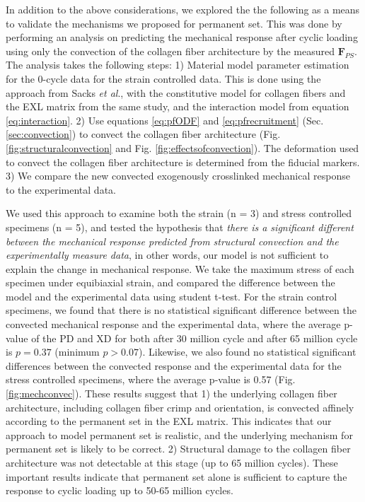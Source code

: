	In addition to the above considerations, we explored the the following as a means to validate the mechanisms we proposed for permanent set. This was done by performing an analysis on predicting the mechanical response after cyclic loading using only the convection of the collagen fiber architecture by the measured $\textbf{F}_{PS}$. The analysis takes the following steps: 1) Material model parameter estimation for the 0-cycle data for the strain controlled data. This is done using the approach from Sacks \textit{et al}.\cite{sacks_novel_2016}, with the constitutive model for collagen fibers and the EXL matrix from the same study, and the interaction model from equation \ref{eq:interaction}. 
	2) Use equations \ref{eq:pfODF} and \ref{eq:pfrecruitment} (Sec.\ref{sec:convection}) to convect the collagen fiber architecture (Fig. \ref{fig:structuralconvection} and Fig. \ref{fig:effectsofconvection}). 
	The deformation used to convect the collagen fiber architecture is determined from the fiducial markers. 
	3) We compare the new convected exogenously crosslinked mechanical response to the experimental data.


	We used this approach to examine both the strain (n = 3) and stress controlled specimens (n = 5), and tested the hypothesis that \emph{there is a significant different between the mechanical response predicted from structural convection and the experimentally measure data}, in other words, our model is not sufficient to explain the change in mechanical response. We take the maximum stress of each specimen under equibiaxial strain, and compared the difference between the model and the experimental data using student t-test.	For the strain control specimens, we found that there is no statistical significant difference between the convected mechanical response and the experimental data, where the average p-value of the PD and XD for both after 30 million cycle and after 65 million cycle is $p = 0.37$ (minimum $p > 0.07$). 
	Likewise, we also found no statistical significant differences between the convected response and the experimental data for the stress controlled specimens, where the average p-value is 0.57 (Fig. \ref{fig:mechconvec}).
	These results suggest that 1) the underlying collagen fiber architecture, including collagen fiber crimp and orientation, is convected affinely according to the permanent set in the EXL matrix. This indicates that our approach to model permanent set is realistic, and the underlying mechanism for permanent set is likely to be correct. 
	2) Structural damage to the collagen fiber architecture was not detectable at this stage (up to 65 million cycles). 
	These important results indicate that permanent set alone is sufficient to capture the response to cyclic loading up to 50-65 million cycles. 


